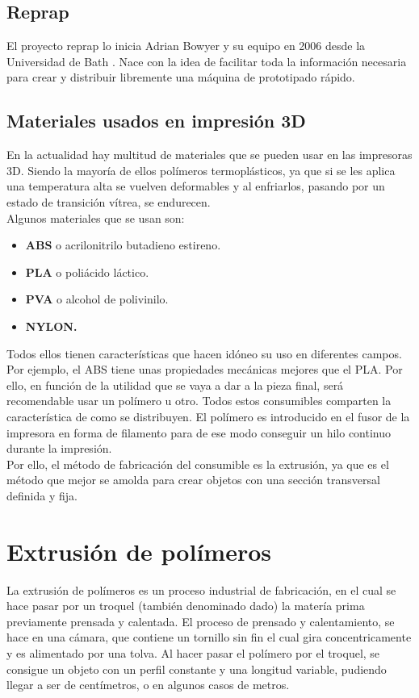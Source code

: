 \subsection{Reprap}
El proyecto reprap lo inicia Adrian Bowyer y su equipo en 2006 desde la Universidad de Bath \cite{jones2011reprap}. Nace con la idea de facilitar toda la información necesaria para crear y distribuir libremente una máquina de prototipado rápido. 


\subsection{Materiales usados en impresión 3D}
\label{impreso_materiales}
En la actualidad hay multitud de materiales que se pueden usar en las impresoras 3D. Siendo la mayoría de ellos polímeros termoplásticos, ya que si se les aplica una temperatura alta se vuelven deformables y al enfriarlos, pasando por un estado de transición vítrea, se endurecen.\\

Algunos materiales que se usan son:
\begin{itemize}
    \item \textbf{ABS} o acrilonitrilo butadieno estireno.
    \item \textbf{PLA} o poliácido láctico.
    \item \textbf{PVA} o alcohol de polivinilo.
    \item \textbf{NYLON.}
\end{itemize}

Todos ellos tienen características que hacen idóneo su uso en diferentes campos. Por ejemplo, el ABS tiene unas propiedades mecánicas mejores que el PLA. Por ello, en función de la utilidad que se vaya a dar a la pieza final, será recomendable usar un polímero u otro. Todos estos consumibles comparten la característica de como se distribuyen. El polímero es introducido en el fusor de la impresora en forma de filamento para de ese modo conseguir un hilo continuo durante la impresión.\\

Por ello, el método de fabricación del consumible es la extrusión, ya que es el método que mejor se amolda para crear objetos con una sección transversal definida y fija.

\section{Extrusión de polímeros}
\label{arte_extrusion}
La extrusión de polímeros es un proceso industrial de fabricación, en el cual se hace pasar por un troquel (también denominado dado) la matería prima previamente prensada y calentada. El proceso de prensado y calentamiento, se hace en una cámara, que contiene un tornillo sin fin el cual gira concentricamente y es alimentado por una tolva. Al hacer pasar el polímero por el troquel, se consigue un objeto con un perfil constante y una longitud variable, pudiendo llegar a ser de centímetros, o en algunos casos de metros.

